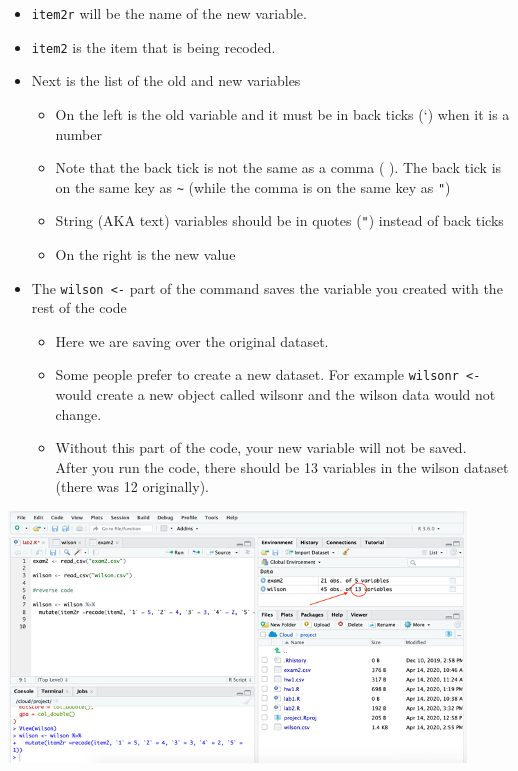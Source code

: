 \documentclass[
]{book}
\providecommand{\tightlist}{%
  \setlength{\itemsep}{0pt}\setlength{\parskip}{0pt}}
\begin{document}
\begin{itemize}
\tightlist
\item
  \texttt{item2r} will be the name of the new variable.
\item
  \texttt{item2} is the item that is being recoded.
\item
  Next is the list of the old and new variables

  \begin{itemize}
  \tightlist
  \item
    On the left is the old variable and it must be in back ticks (`) when it is a number
  \item
    Note that the back tick is not the same as a comma ( \texttt{\textquotesingle{}} ). The back tick is on the same key as \texttt{\textasciitilde{}} (while the comma is on the same key as \texttt{"})
  \item
    String (AKA text) variables should be in quotes (\texttt{"}) instead of back ticks
  \item
    On the right is the new value
  \end{itemize}
\item
  The \texttt{wilson\ \textless{}-} part of the command saves the variable you created with the rest of the code

  \begin{itemize}
  \tightlist
  \item
    Here we are saving over the original dataset.
  \item
    Some people prefer to create a new dataset. For example \texttt{wilsonr\ \textless{}-} would create a new object called wilsonr and the wilson data would not change.
  \item
    Without this part of the code, your new variable will not be saved.\\
    After you run the code, there should be 13 variables in the wilson dataset (there was 12 originally).
  \end{itemize}
\end{itemize}

\includegraphics{img/mutatewilson.png}
\end{document}

